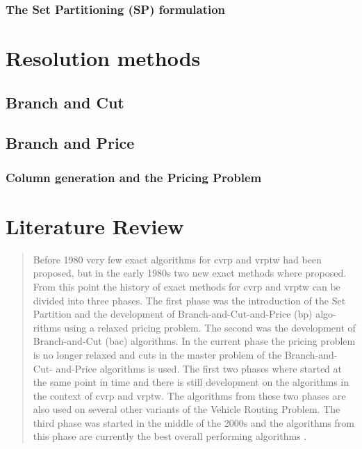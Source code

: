 \subsubsection{The Set Partitioning (SP) formulation}

\section{Resolution methods}

\subsection{Branch and Cut}

\subsection{Branch and Price}

\subsubsection{Column generation and the Pricing Problem}

\section{Literature Review}

\begin{quote}
	Before 1980 very few exact algorithms for cvrp and vrptw had been
	proposed, but in the early 1980s two new exact methods where proposed.
	From this point the history of exact methods for cvrp and vrptw can
	be divided into three phases. The first phase was the introduction of the
	Set Partition and the development of Branch-and-Cut-and-Price (bp) algo-
	rithms using a relaxed pricing problem. The second was the development of
	Branch-and-Cut (bac) algorithms. In the current phase the pricing problem
	is no longer relaxed and cuts in the master problem of the Branch-and-Cut-
	and-Price algorithms is used. The first two phases where started at the same
	point in time and there is still development on the algorithms in the context
	of cvrp and vrptw. The algorithms from these two phases are also used
	on several other variants of the Vehicle Routing Problem. The third phase
	was started in the middle of the 2000s and the algorithms from this phase
	are currently the best overall performing algorithms \cite{jepsen_branch-and-cut_2011}.
\end{quote}

